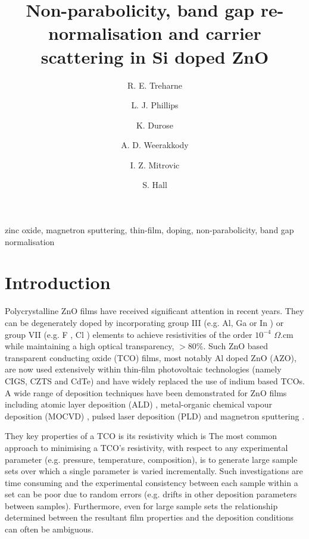 \documentclass[preprint]{elsarticle}
\begin{document}
\begin{frontmatter}


\title{Non-parabolicity, band gap re-normalisation and carrier scattering in Si doped ZnO}
\author[label1]{R. E. Treharne}
\author[label1]{L. J. Phillips}
\author[label1]{K. Durose}
\address[label1]{Stephenson Institute for Renewable Energy, University of Liverpool, UK}
\author[label2]{A. D. Weerakkody}
\author[label2]{I. Z. Mitrovic}
\author[label2]{S. Hall}
\address[label2]{Department of Electrical Eng. and Electronics, University of Liverpool, UK}

\begin{abstract}

\end{abstract}


\begin{keyword}
zinc oxide, magnetron sputtering, thin-film, doping, non-parabolicity, band gap normalisation
\end{keyword}

\end{frontmatter}

\linenumbers

\section{Introduction}

Polycrystalline ZnO films have received significant attention in recent years. They can be degenerately doped by incorporating group III (e.g. Al, Ga or In \cite{Minami2005}) or group VII (e.g. F \cite{Gordon1991, Treharne2010}, Cl \cite{Lincot2009}) elements to achieve resistivities of the order $10^{-4}$ $\Omega$.cm while maintaining a high optical transparency, $>80\%$. Such ZnO based transparent conducting oxide (TCO) films, most notably Al doped ZnO (AZO), are now used extensively within thin-film photovoltaic technologies (namely CIGS, CZTS and CdTe) and have widely replaced the use of indium based TCOs. A wide range of deposition techniques have been demonstrated for ZnO films including atomic layer deposition (ALD) \cite{Chalker2013}, metal-organic chemical vapour deposition (MOCVD) \cite{Myong1997}, pulsed laser deposition (PLD) \cite{Shin2006} and magnetron sputtering \cite{Minami2005, Minami2006, Ellmer2001}. 

They key properties of a TCO is its resistivity which is The most common approach to minimising a TCO's resistivity, with respect to any experimental parameter (e.g. pressure, temperature, composition), is to generate large sample sets over which a single parameter is varied incrementally. Such investigations are time consuming and the experimental consistency between each sample within a set can be poor due to random errors (e.g. drifts in other deposition parameters between samples). Furthermore, even for large sample sets the relationship determined between the resultant film properties and the deposition conditions can often be ambiguous.
\end{document}
